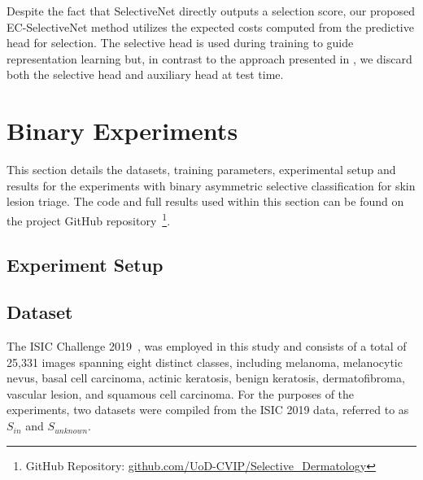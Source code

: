 Despite the fact that SelectiveNet directly outputs a selection score, our proposed EC-SelectiveNet method utilizes the expected costs computed from the predictive head for selection. The selective head is used during training to guide representation learning but, in contrast to the approach presented in \cite{selective2019geifman}, we discard both the selective head and auxiliary head at test time.



\section{Binary Experiments}
\label{sec:selective_binary_experiment}
This section details the datasets, training parameters, experimental setup and results for the experiments with binary asymmetric selective classification for skin lesion triage. The code and full results used within this section can be found on the project GitHub repository~\footnote{GitHub Repository: \url{github.com/UoD-CVIP/Selective_Dermatology}}.

\subsection{Experiment Setup}

\subsection{Dataset}
\label{subsec:selective_binary_dataset}
The ISIC Challenge 2019~\citep{codella2018skin,combalia2019bcn20000,tschandl2018ham10000}, was employed in this study and consists of a total of 25,331 images spanning eight distinct classes, including melanoma, melanocytic nevus, basal cell carcinoma, actinic keratosis, benign keratosis, dermatofibroma, vascular lesion, and squamous cell carcinoma. For the purposes of the experiments, two datasets were compiled from the ISIC 2019 data, referred to as $S_{in}$ and $S_{unknown}$.

